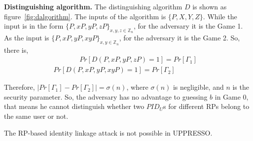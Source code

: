 \noindent\textbf{Distinguishing algorithm.} The distinguishing algorithm $D$ is shown as figure~\ref{fig:dalgorithm}. 
The inputs of the algorithm is $\{P,X,Y,Z\}$. While the input is in the form $\{P,xP,yP,zP\}_{x,y,z \in \mathbb{Z}_n}$, for the adversary it is the Game 1. As the input is $\{P,xP,yP,xyP\}_{x,y \in \mathbb{Z}_n}$, for the adversary it is the Game 2. So, there is,
\vspace{-\topsep}
\begin{multline*}
   \ \ \ \ \ \ \ \ \ \ \ \ \ \ \ \ \  Pr[D(P,xP,yP,zP)=1]=Pr[{\Gamma_1}]\\
   Pr[D(P,xP,yP,xyP)=1]=Pr[{\Gamma_2}]\ \ \ \ \ \ \ \ \ \ \ \ \ \ \ \ \ \ 
\end{multline*}

\vspace{-\topsep}
Therefore, $|Pr[\Gamma_1]-Pr[\Gamma_2]|=\sigma(n)$, where $\sigma(n)$ is negligible, and $n$ is the security parameter. So, the adversary has no advantage to guessing $b$ in Game 0, that means he cannot distinguish whether two $PID_U$s for different RPs belong to the same user or not. 

The RP-based identity linkage attack is not possible in UPPRESSO.

